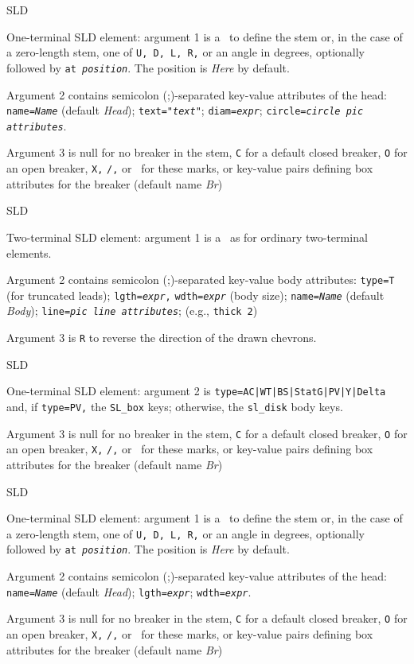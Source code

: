   {SLD}%
  {One-terminal SLD element: argument 1 is a \linespec\ to define the stem
   or, in the case of a zero-length stem, one of {\tt U, D, L, R,} or an
   angle in degrees, optionally followed by {\tt at {\sl position}}.
   The position is {\sl Here} by default.

   Argument 2 contains semicolon (;)-separated key-value attributes
   of the head:
   {\tt name={\sl{}Name}} (default {\sl Head});
   {\tt text="{\sl{}text}"};
   {\tt diam={\sl{}expr}};
   {\tt circle={\sl{}circle pic attributes}}.

   Argument 3 is null for no breaker in the stem, {\tt C} for a default
   closed breaker, {\tt O} for an open breaker, {\tt X,} {\tt /,} or \bsl\ for
   these marks, or
   key-value pairs defining box attributes for the breaker
   (default name {\sl Br})
   \label{sl_disk}%
   }%
%
  {SLD}%
  {Two-terminal SLD element: argument 1 is a \linespec\ as for ordinary
   two-terminal elements.

   Argument 2 contains semicolon (;)-separated key-value body attributes:
   {\tt type=T} (for truncated leads);
   {\tt lgth={\sl{}expr},}%
   {\tt wdth={\sl{}expr}} (body size);
   {\tt name={\sl{}Name}} (default {\sl Body});
   {\tt line={\sl{}pic line attributes}}; (e.g., {\tt thick 2})

   Argument 3 is {\tt R} to reverse the direction of the drawn chevrons.
   }%
%
  {SLD}%
  {One-terminal SLD element: argument 2 is
   {\tt type=AC|WT|BS|StatG|PV|Y|Delta} and,
   if {\tt type=PV,} the {\tt SL\_box} keys;
   otherwise, the {\tt sl\_disk} body keys.

   Argument 3 is null for no breaker in the stem, {\tt C} for a default
   closed breaker, {\tt O} for an open breaker, {\tt X,} {\tt /,} or \bsl\ for
   these marks, or
   key-value pairs defining box attributes for the breaker
   (default name {\sl Br})
   }%
%
  {SLD}%
  {One-terminal SLD element: argument 1 is a \linespec\ to define the stem
   or, in the case of a zero-length stem, one of {\tt U, D, L, R,} or an
   angle in degrees, optionally followed by {\tt at {\sl position}}.
   The position is {\sl Here} by default.

   Argument 2 contains semicolon (;)-separated key-value attributes
   of the head:
   {\tt name={\sl{}Name}} (default {\sl Head});
   {\tt lgth={\sl{}expr}};
   {\tt wdth={\sl{}expr}}.

   Argument 3 is null for no breaker in the stem, {\tt C} for a default
   closed breaker, {\tt O} for an open breaker, {\tt X,} {\tt /,} or \bsl\ for
   these marks, or
   key-value pairs defining box attributes for the breaker
   (default name {\sl Br})
   }%

